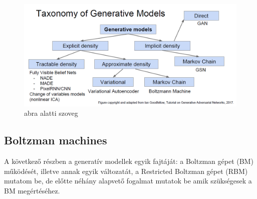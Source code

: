 
\begin{figure}[ht]
	\centering
	\includegraphics[width=0.8\columnwidth]{figures/generative_model_taxonomy.png}
	\caption{abra alatti szoveg}
	\label{fig:gen_models_tax}
\end{figure}


\subsection{Boltzman machines}

A következő részben a generatív modellek egyik fajtáját: a Boltzman gépet (BM) működését, illetve annak egyik változatát, a Restricted Boltzman gépet (RBM) mutatom be, de előtte néhány alapvető fogalmat mutatok be amik szükségesek a BM megértéséhez.


